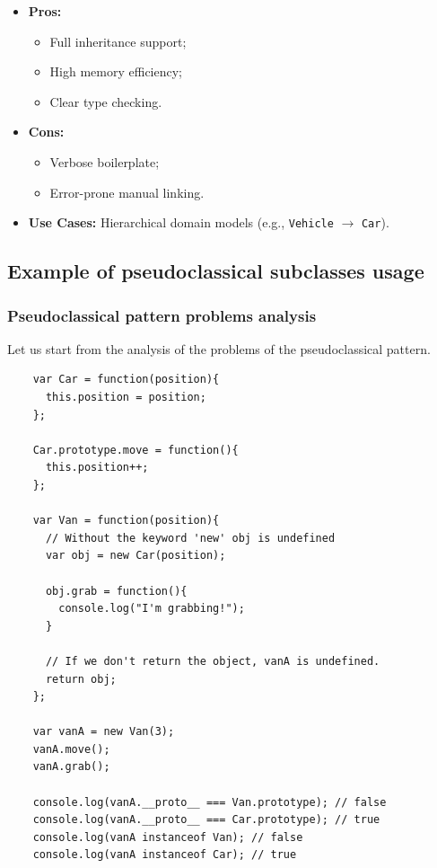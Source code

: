\documentclass{scrbook}
\begin{document}
\begin{itemize}
    \item
        \textbf{Pros:}
        \begin{itemize}
            \item Full inheritance support;
            \item High memory efficiency;
            \item Clear type checking.
        \end{itemize}
    
    \item
        \textbf{Cons:}
        \begin{itemize}
            \item Verbose boilerplate;
            \item Error-prone manual linking.
        \end{itemize}
    
    \item \textbf{Use Cases:} Hierarchical domain models (e.g., \texttt{Vehicle} $\rightarrow$ \texttt{Car}).
\end{itemize}

\subsection{Example of pseudoclassical subclasses usage}

\subsubsection{Pseudoclassical pattern problems analysis}

Let us start from the analysis of the problems of the pseudoclassical pattern.

\begin{lstlisting}
    var Car = function(position){
      this.position = position;
    };
    
    Car.prototype.move = function(){
      this.position++;
    };
    
    var Van = function(position){
      // Without the keyword 'new' obj is undefined
      var obj = new Car(position);
      
      obj.grab = function(){
        console.log("I'm grabbing!");
      }

      // If we don't return the object, vanA is undefined.
      return obj;
    };
    
    var vanA = new Van(3);
    vanA.move();
    vanA.grab();
    
    console.log(vanA.__proto__ === Van.prototype); // false
    console.log(vanA.__proto__ === Car.prototype); // true
    console.log(vanA instanceof Van); // false
    console.log(vanA instanceof Car); // true
\end{lstlisting}
\end{document}
